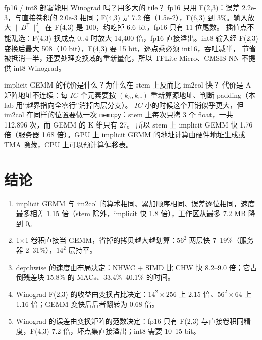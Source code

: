\documentclass[11pt,a4paper]{ctexart}
\begin{document}
\begin{iqbox}{fp16 / int8 部署能用 Winograd 吗？用多大的 tile？}
fp16 只用 F(2,3)：误差 2.2e-3，与直接卷积的 2.0e-3 相同；F(4,3) 是 7.2 倍（1.5e-2），F(6,3) 到 3\%。输入放大 $\|B^{\mathsf T}\|_\infty^2$ 在 F(4,3) 是 100，约吃掉 6.6 bit，fp16 只有 11 位尾数。
插值点不能乱选：F(4,3) 换成点 0..4 时放大 14,400 倍，fp16 直接溢出。int8 输入经 F(2,3) 变换后最大 508（10 bit），F(4,3) 要 15 bit，逐点乘必须 int16，吞吐减半，
节省被抵消一半，还要处理变换域的重新量化，所以 TFLite Micro、CMSIS-NN 不提供 int8 Winograd。
\end{iqbox}

\begin{iqbox}{implicit GEMM 的代价是什么？为什么在 stem 上反而比 im2col 快？}
代价是 A 矩阵地址不连续：每 $IC$ 个元素要按 $(k_h,k_w)$ 重新算源地址、判断 padding（本 lab 用“越界指向全零行”消掉内层分支）。
$IC$ 小的时候这个开销似乎更大，但 im2col 在同样的位置要做一次 \texttt{memcpy}：stem 上每次只拷 3 个 float，一共 112,896 次，而 GEMM 的 K 维只有 27。
所以 stem 上 implicit GEMM 快 1.76 倍（服务器 1.68 倍）。GPU 上 implicit GEMM 的地址计算由硬件地址生成或 TMA 隐藏，CPU 上可以预计算偏移表。
\end{iqbox}

\section{结论}\label{sec:conclusion}

\begin{findingbox}[：五条可以带走的结论]
\begin{enumerate}[label=(\arabic*)]
  \item implicit GEMM 与 im2col 的算术相同、累加顺序相同、误差逐位相同，速度最多相差 1.15 倍（stem 除外，implicit 快 1.8 倍），工作区从最多 7.2 MB 降到 0。
  \item 1×1 卷积直接当 GEMM，省掉的拷贝越大越划算：$56^2$ 两层快 7--19\%（服务器 2--31\%），$14^2$ 层持平。
  \item depthwise 的速度由布局决定：NHWC + SIMD 比 CHW 快 8.2--9.0 倍；它占倒残差块 15.8\% 的 MACs、33.4\%--40.1\% 的时间。
  \item Winograd F(2,3) 的收益由变换占比决定：$14^2\times256$ 上 2.15 倍、$56^2\times64$ 上 1.16 倍；GEMM 变快后后者翻转为 0.68 倍。
  \item Winograd 的误差由变换矩阵的范数决定：fp16 只有 F(2,3) 与直接卷积同精度，F(4,3) 7.2 倍，坏点集直接溢出；int8 需要 10--15 bit。
\end{enumerate}
\end{findingbox}
\end{document}
